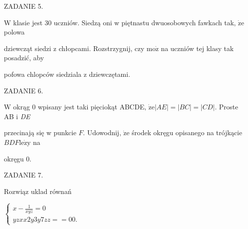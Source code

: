 \documentclass[a4paper,12pt]{article}
\begin{document}
ZADANIE 5.

$\mathrm{W}$ klasie jest 30 uczniów. Siedzą oni w piętnastu dwuosobowych fawkach tak, $\dot{\mathrm{z}}\mathrm{e}$ polowa

dziewcząt siedzi z chłopcami. Rozstrzygnij, czy $\mathrm{m}\mathrm{o}\dot{\mathrm{z}}$ na uczniów tej klasy tak posadzić, aby

pofowa chlopców siedziala z dziewczętami.

ZADANIE 6.

$\mathrm{W}$ okrąg $0$ wpisany jest taki pięciokąt ABCDE, $\dot{\mathrm{z}}\mathrm{e} |AE| = |BC| = |CD|$. Proste AB $\mathrm{i}$ {\it DE}

przecinają się w punkcie $F$. Udowodnij, $\dot{\mathrm{z}}\mathrm{e}$ środek okręgu opisanego na trójkącie $BDF\mathrm{l}\mathrm{e}\dot{\mathrm{z}}\mathrm{y}$ na

okręgu $0.$

ZADANIE 7.

Rozwiąz uklad równań

$\left\{\begin{array}{l}
x-\frac{1}{xyz}=0\\
yzxx2y3y7zz==00.
\end{array}\right.$
\end{document}
